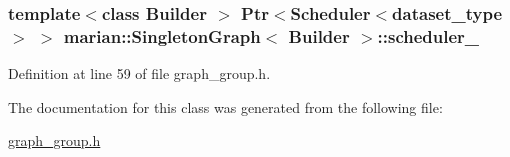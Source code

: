 \subsubsection[{\texorpdfstring{scheduler\+\_\+}{scheduler_}}]{\setlength{\rightskip}{0pt plus 5cm}template$<$class Builder $>$ {\bf Ptr}$<${\bf Scheduler}$<${\bf dataset\+\_\+type}$>$ $>$ {\bf marian\+::\+Singleton\+Graph}$<$ Builder $>$\+::scheduler\+\_\+\hspace{0.3cm}{\ttfamily [private]}}\hypertarget{classmarian_1_1SingletonGraph_a5ed8cebe3408e9a412c201503a24cffe}{}\label{classmarian_1_1SingletonGraph_a5ed8cebe3408e9a412c201503a24cffe}


Definition at line 59 of file graph\+\_\+group.\+h.



The documentation for this class was generated from the following file\+:\begin{DoxyCompactItemize}
\item 
\hyperlink{graph__group_8h}{graph\+\_\+group.\+h}\end{DoxyCompactItemize}
